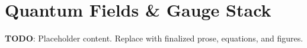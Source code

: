 
\section{Quantum Fields & Gauge Stack}
\label{sec:quantum-fields-gauge-stack}

\textbf{TODO}: Placeholder content. Replace with finalized prose, equations, and figures.

